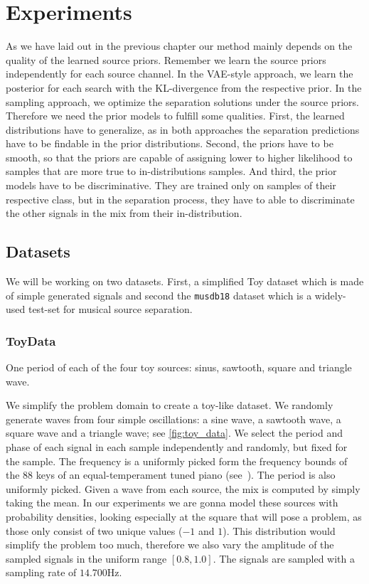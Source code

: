 \chapter{Experiments}%
\label{ch:experiments}
As we have laid out in the previous chapter our method mainly depends on the quality of the learned source priors. Remember we learn the source priors independently for each source channel. In the VAE-style approach, we learn the posterior for each search with the KL-divergence from the respective prior. In the sampling approach, we optimize the separation solutions under the source priors. Therefore we need the prior models to fulfill some qualities. First, the learned distributions have to generalize, as in both approaches the separation predictions have to be findable in the prior distributions. Second, the priors have to be smooth, so that the priors are capable of assigning lower to higher likelihood to samples that are more true to in-distributions samples. And third, the prior models have to be discriminative. They are trained only on samples of their respective class, but in the separation process, they have to able to discriminate the other signals in the mix from their in-distribution.

\section{Datasets}
We will be working on two datasets. First, a simplified Toy dataset which is made of simple generated signals and second the \texttt{musdb18} dataset which is a widely-used test-set for musical source separation.

\subsection{ToyData}
\begin{marginfigure}[5em]
    \resizebox{\textwidth}{!}{%
    }%
    \caption{One period of each of the four toy sources: sinus, sawtooth, square and triangle wave.}%
    \label{fig:toy_data}
\end{marginfigure}

We simplify the problem domain to create a toy-like dataset. We randomly generate waves from four simple oscillations: a sine wave, a sawtooth wave, a square wave and a triangle wave; see \cref{fig:toy_data}.  We select the period and phase of each signal in each sample independently and randomly, but fixed for the sample. The frequency is a uniformly picked form the frequency bounds of the 88 keys of an equal-temperament tuned piano (see~). The period is also uniformly picked. Given a wave from each source, the mix is computed by simply taking the mean. In our experiments we are gonna model these sources with probability densities, looking especially at the square that will pose a problem, as those only consist of two unique values (\(-1\) and \(1\)). This distribution would simplify the problem too much, therefore we also vary the amplitude of the sampled signals in the uniform range \([0.8, 1.0]\). The signals are sampled with a sampling rate of \(14.700 \si{\Hz}\).

